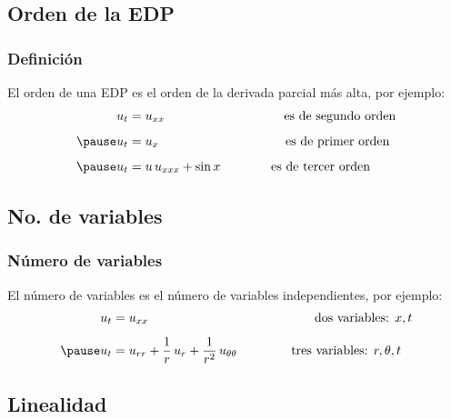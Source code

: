 \documentclass[12pt]{beamer}
\begin{document}
\subsection*{Orden de la EDP}

\begin{frame}
\frametitle{Definición}
El orden de una EDP es el orden de la derivada parcial más alta, por ejemplo:
\pause
\begin{eqnarray*}
\begin{aligned}
u_{t} &= u_{xx} \hspace{3.3cm} \mbox{es de segundo orden} \\[0.5em] \pause
u_{t} &= u_{x} \hspace{3.5cm} \mbox{es de primer orden} \\[0.5em] \pause
u_{t} &= u \, u_{xxx} + \sin x \hspace{1.4cm} \mbox{es de tercer orden}
\end{aligned}
\end{eqnarray*}
\end{frame}

\subsection*{No. de variables}

\begin{frame}
\frametitle{Número de variables}
El número de variables es el número de variables independientes, por ejemplo:
\pause
\begin{eqnarray*}
\begin{aligned}
u_{t} &= u_{xx} \hspace{3cm} \hspace{1.61cm} \mbox{dos variables: } x, t \\[0.5em] \pause
u_{t} &= u_{rr} + \dfrac{1}{r} \, u_{r} + \dfrac{1}{r^{2}} \, u_{\theta \theta} \hspace{1.5cm} \mbox{tres variables: } r, \theta, t
\end{aligned}
\end{eqnarray*}
\end{frame}

\subsection*{Linealidad}
\end{document}
